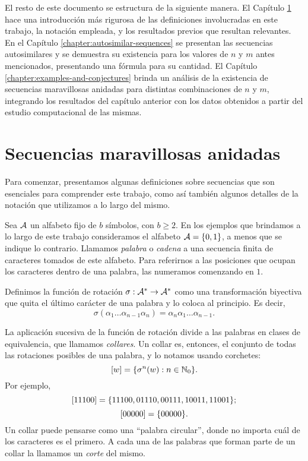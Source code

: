 El resto de este documento se estructura de la siguiente manera. El Capítulo
\ref{chapter:preliminaries} hace una introducción más rigurosa de las definiciones
involucradas en este trabajo, la notación empleada, y los resultados previos
que resultan relevantes. En el Capítulo \ref{chapter:autosimilar-sequences}
se presentan las secuencias autosimilares y se demuestra su existencia para
los valores de $n$ y $m$ antes mencionados, presentando una fórmula para su
cantidad. El Capítulo \ref{chapter:examples-and-conjectures} brinda un
análisis de la existencia de secuencias maravillosas anidadas para distintas
combinaciones de $n$ y $m$, integrando los resultados del capítulo anterior
con los datos obtenidos a partir del estudio computacional de las mismas.

\newpage

\chapter{Secuencias maravillosas anidadas}
\label{chapter:preliminaries}

Para comenzar, presentamos algunas definiciones sobre secuencias que son
esenciales para comprender este trabajo, como así también algunos detalles
de la notación que utilizamos a lo largo del mismo.

Sea $\mathcal{A}$ un alfabeto fijo de $b$ símbolos, con $b \geq 2$. En los
ejemplos que brindamos a lo largo de este trabajo consideramos el alfabeto
$\mathcal{A} = \lbrace 0, 1 \rbrace$, a menos que se indique lo contrario.
Llamamos \emph{palabra} o \emph{cadena} a una secuencia finita de caracteres
tomados de este alfabeto.
Para referirnos a las posiciones que ocupan los caracteres dentro de una
palabra, las numeramos comenzando en $1$.

Definimos la función de rotación $\sigma: \mathcal{A}^* \to \mathcal{A}^*$ como
una transformación biyectiva que quita el último carácter de una palabra y lo
coloca al principio. Es decir,
\[ \sigma(\alpha_1\dots\alpha_{n-1}\alpha_n) =
	\alpha_n\alpha_1\dots\alpha_{n-1}. \]

La aplicación sucesiva de la función de rotación divide a las palabras en clases
de equivalencia, que llamamos \emph{collares}. Un collar es, entonces, el
conjunto de todas las rotaciones posibles de una palabra, y lo notamos usando
corchetes:
\[ \left[w\right] = \lbrace \sigma^{n}(w) : n \in \mathbb{N}_0 \rbrace. \]
Por ejemplo,
\[ \left[11100\right] = \lbrace 11100, 01110, 00111, 10011, 11001 \rbrace; \]
\[ \left[00000\right] = \lbrace 00000 \rbrace. \]
Un collar puede pensarse como una ``palabra circular'', donde no importa
cuál de los caracteres es el primero. A cada una de las palabras que forman
parte de un collar la llamamos un \emph{corte} del mismo.

